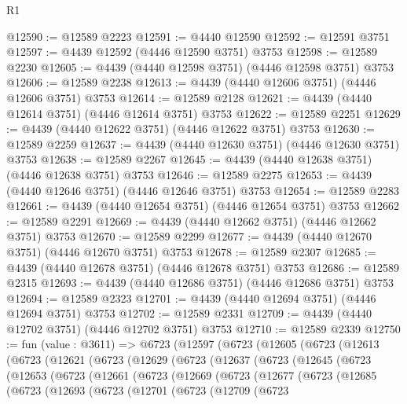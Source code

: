 \begin{lexlean}{R1}
\begin{coremodule}
@12590 := @12589 @2223
@12591 := @4440 @12590
@12592 := @12591 @3751
@12597 := @4439 @12592 (@4446 @12590 @3751) @3753
@12598 := @12589 @2230
@12605 := @4439 (@4440 @12598 @3751) (@4446 @12598 @3751) @3753
@12606 := @12589 @2238
@12613 := @4439 (@4440 @12606 @3751) (@4446 @12606 @3751) @3753
@12614 := @12589 @2128
@12621 := @4439 (@4440 @12614 @3751) (@4446 @12614 @3751) @3753
@12622 := @12589 @2251
@12629 := @4439 (@4440 @12622 @3751) (@4446 @12622 @3751) @3753
@12630 := @12589 @2259
@12637 := @4439 (@4440 @12630 @3751) (@4446 @12630 @3751) @3753
@12638 := @12589 @2267
@12645 := @4439 (@4440 @12638 @3751) (@4446 @12638 @3751) @3753
@12646 := @12589 @2275
@12653 := @4439 (@4440 @12646 @3751) (@4446 @12646 @3751) @3753
@12654 := @12589 @2283
@12661 := @4439 (@4440 @12654 @3751) (@4446 @12654 @3751) @3753
@12662 := @12589 @2291
@12669 := @4439 (@4440 @12662 @3751) (@4446 @12662 @3751) @3753
@12670 := @12589 @2299
@12677 := @4439 (@4440 @12670 @3751) (@4446 @12670 @3751) @3753
@12678 := @12589 @2307
@12685 := @4439 (@4440 @12678 @3751) (@4446 @12678 @3751) @3753
@12686 := @12589 @2315
@12693 := @4439 (@4440 @12686 @3751) (@4446 @12686 @3751) @3753
@12694 := @12589 @2323
@12701 := @4439 (@4440 @12694 @3751) (@4446 @12694 @3751) @3753
@12702 := @12589 @2331
@12709 := @4439 (@4440 @12702 @3751) (@4446 @12702 @3751) @3753
@12710 := @12589 @2339
@12750 := fun (value : @3611) =>
  @6723
    (@12597
      (@6723
        (@12605
          (@6723
            (@12613
              (@6723
                (@12621
                  (@6723
                    (@12629
                      (@6723
                        (@12637
                          (@6723
                            (@12645
                              (@6723
                                (@12653
                                  (@6723
                                    (@12661
                                      (@6723
                                        (@12669
                                          (@6723
                                            (@12677
                                              (@6723
                                                (@12685
                                                  (@6723
                                                    (@12693
                                                      (@6723
                                                        (@12701
                                                          (@6723
                                                            (@12709
                                                              (@6723

\end{coremodule}
\end{lexlean}
